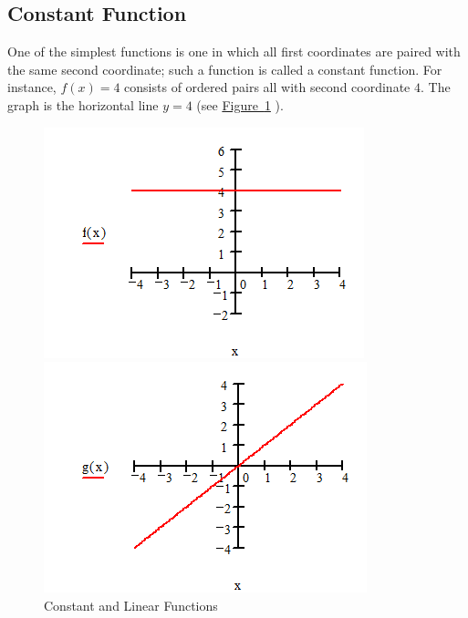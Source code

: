 \documentclass[10pt,]{book}
\theoremstyle{ptxdefinitionnotitle}
\theoremstyle{ptxdefinitiontitle}
\numberwithin{equation}{section}
\begin{document}
\subsection[{Constant Function}]{Constant Function}\label{subsection-2}
\hypertarget{p-42}{}%
One of the simplest functions is one in which all first coordinates are paired with the same second coordinate; such a function is called a constant function.  For instance, \(f(x) = 4\) consists of ordered pairs all with second coordinate \(4\).  The graph is the horizontal line \(y = 4\) (see \hyperref[chapter02-section02-constant-and-linear]{Figure~\ref{chapter02-section02-constant-and-linear}} ).%
\begin{figure}
\centering
\begin{sidebyside}{2}{0}{0}{0}
\begin{sbspanel}{0.5}
\includegraphics[width=1\linewidth]{./src/images/chapter02/chapter02section02-constant-a.png}
\end{sbspanel}
\begin{sbspanel}{0.5}
\includegraphics[width=1\linewidth]{./src/images/chapter02/chapter02section02-constant-b.png}
\end{sbspanel}
\end{sidebyside}
\caption{Constant and Linear Functions\label{chapter02-section02-constant-and-linear}}
\end{figure}
\typeout{************************************************}
\typeout{************************************************}
\end{document}
